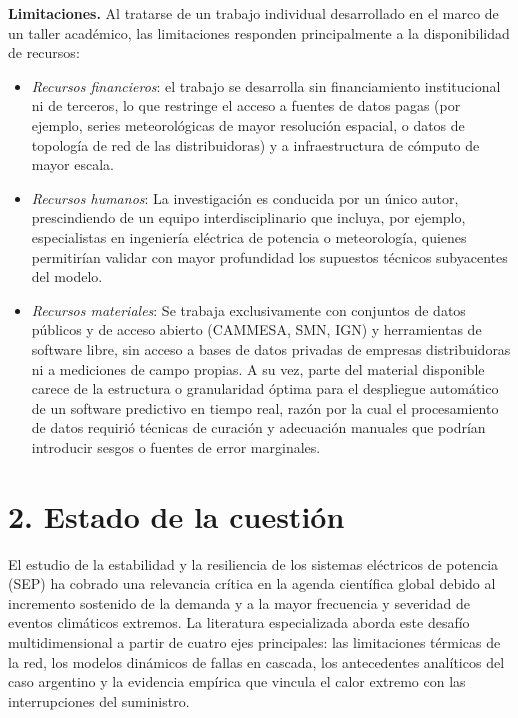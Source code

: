 \textbf{Limitaciones.} Al tratarse de un trabajo individual desarrollado en el marco de un taller académico, las limitaciones responden principalmente a la disponibilidad de recursos:

\begin{itemize}
\item
  \emph{Recursos financieros}: el trabajo se desarrolla sin financiamiento institucional ni de terceros, lo que restringe el acceso a fuentes de datos pagas (por ejemplo, series meteorológicas de mayor resolución espacial, o datos de topología de red de las distribuidoras) y a infraestructura de cómputo de mayor escala.
\item
  \emph{Recursos humanos}: La investigación es conducida por un único autor, prescindiendo de un equipo interdisciplinario que incluya, por ejemplo, especialistas en ingeniería eléctrica de potencia o meteorología, quienes permitirían validar con mayor profundidad los supuestos técnicos subyacentes del modelo.
\item
  \emph{Recursos materiales}: Se trabaja exclusivamente con conjuntos de datos públicos y de acceso abierto (CAMMESA, SMN, IGN) y herramientas de software libre, sin acceso a bases de datos privadas de empresas distribuidoras ni a mediciones de campo propias. A su vez, parte del material disponible carece de la estructura o granularidad óptima para el despliegue automático de un software predictivo en tiempo real, razón por la cual el procesamiento de datos requirió técnicas de curación y adecuación manuales que podrían introducir sesgos o fuentes de error marginales.
\end{itemize}

\hypertarget{estado-de-la-cuestiuxf3n}{%
\section{2. Estado de la cuestión}\label{estado-de-la-cuestiuxf3n}}

El estudio de la estabilidad y la resiliencia de los sistemas eléctricos de potencia (SEP) ha cobrado una relevancia crítica en la agenda científica global debido al incremento sostenido de la demanda y a la mayor frecuencia y severidad de eventos climáticos extremos. La literatura especializada aborda este desafío multidimensional a partir de cuatro ejes principales: las limitaciones térmicas de la red, los modelos dinámicos de fallas en cascada, los antecedentes analíticos del caso argentino y la evidencia empírica que vincula el calor extremo con las interrupciones del suministro.

